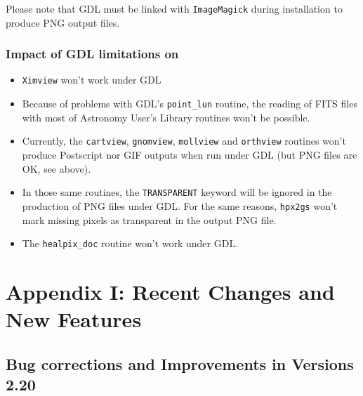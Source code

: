 \documentclass[12pt,twoside]{article}
\begin{document}
Please note that GDL must be linked with {\tt ImageMagick} during installation to produce PNG
output files.

\subsubsection{Impact of GDL limitations on \healpix}
\begin{itemize}
\item {\tt Ximview} won't work under GDL \gdlversion
\item Because of problems with GDL's {\tt point\_lun} routine, the reading of
FITS files with most of Astronomy User's Library routines won't be possible.
\item Currently, the 
{\tt cartview},
{\tt gnomview},
{\tt mollview} and  
{\tt orthview} 
routines won't produce Postscript nor GIF outputs when run under GDL (but PNG
files are OK, see above).
\item In those same routines, the {\tt TRANSPARENT} keyword will be ignored in the
production of PNG files under GDL. For the same reasons, {\tt hpx2gs} won't mark missing pixels as
transparent in the output PNG file.
\item The {\tt healpix\_doc} routine won't work under GDL.
\end{itemize}


\vfill\newpage
\section{Appendix I: Recent Changes and New Features}
\label{sec:newfeatures}
\subsection{Bug corrections and Improvements in Versions 2.20} %
\end{document}
